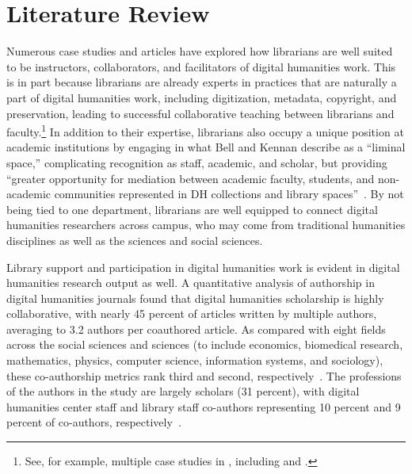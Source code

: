 \documentclass[final]{anthology-ch}
\begin{document}
\section{Literature Review} \label{sec:litreview}

Numerous case studies and articles have explored how librarians are well suited to be instructors, collaborators, and facilitators of digital humanities work. This is in part because librarians are already experts in practices that are naturally a part of digital humanities work, including digitization, metadata, copyright, and preservation, leading to successful collaborative teaching between librarians and faculty.\footnote{See, for example, multiple case studies in \cite{hartsellgundy2015digital}, including \cite[69--82]{borovsky2015digital} and \cite[151--176]{rosenblum2015collaboration}.} In addition to their expertise, librarians also occupy a unique position at academic institutions by engaging in what Bell and Kennan describe as a \enquote{liminal space,} complicating recognition as staff, academic, and scholar, but providing \enquote{greater opportunity for mediation between academic faculty, students, and non-academic communities represented in DH collections and library spaces}~\cite[pp.~166--167]{bell2021partnering}. By not being tied to one department, librarians are well equipped to connect digital humanities researchers across campus, who may come from traditional humanities disciplines as well as the sciences and social sciences.

Library support and participation in digital humanities work is evident in digital humanities research output as well. A quantitative analysis of authorship in digital humanities journals found that digital humanities scholarship is highly collaborative, with nearly 45 percent of articles written by multiple authors, averaging to 3.2 authors per coauthored article. As compared with eight fields across the social sciences and sciences (to include economics, biomedical research, mathematics, physics, computer science, information systems, and sociology), these co-authorship metrics rank third and second, respectively~\cite[p.~682]{wong2016digital}. The professions of the authors in the study are largely scholars (31 percent), with digital humanities center staff and library staff co-authors representing 10 percent and 9 percent of co-authors, respectively~\cite[p.~679]{wong2016digital}.
\end{document}
